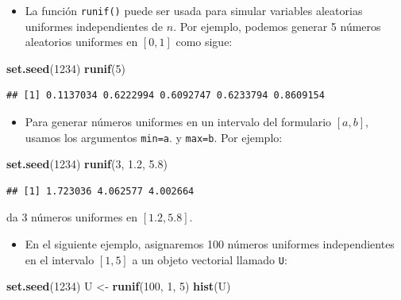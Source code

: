 \documentclass[]{book}
\newenvironment{Shaded}{\begin{snugshade}}{\end{snugshade}}
\newcommand{\KeywordTok}[1]{\textcolor[rgb]{0.13,0.29,0.53}{\textbf{#1}}}
\newcommand{\DecValTok}[1]{\textcolor[rgb]{0.00,0.00,0.81}{#1}}
\newcommand{\FloatTok}[1]{\textcolor[rgb]{0.00,0.00,0.81}{#1}}
\newcommand{\StringTok}[1]{\textcolor[rgb]{0.31,0.60,0.02}{#1}}
\newcommand{\NormalTok}[1]{#1}
\providecommand{\tightlist}{%
  \setlength{\itemsep}{0pt}\setlength{\parskip}{0pt}}
\begin{document}
\begin{itemize}
\tightlist
\item
  La función \texttt{runif()} puede ser usada para simular variables
  aleatorias uniformes independientes de \(n\). Por ejemplo, podemos
  generar 5 números aleatorios uniformes en \([0,1]\) como sigue:
\end{itemize}

\begin{Shaded}
\begin{Highlighting}[]
\KeywordTok{set.seed}\NormalTok{(}\DecValTok{1234}\NormalTok{)}
\KeywordTok{runif}\NormalTok{(}\DecValTok{5}\NormalTok{)}
\end{Highlighting}
\end{Shaded}

\begin{verbatim}
## [1] 0.1137034 0.6222994 0.6092747 0.6233794 0.8609154
\end{verbatim}

\begin{itemize}
\tightlist
\item
  Para generar números uniformes en un intervalo del formulario
  \([a,b]\), usamos los argumentos \texttt{min=a}. y \texttt{max=b}. Por
  ejemplo:
\end{itemize}

\begin{Shaded}
\begin{Highlighting}[]
\KeywordTok{set.seed}\NormalTok{(}\DecValTok{1234}\NormalTok{)}
\KeywordTok{runif}\NormalTok{(}\DecValTok{3}\NormalTok{, }\FloatTok{1.2}\NormalTok{, }\FloatTok{5.8}\NormalTok{)}
\end{Highlighting}
\end{Shaded}

\begin{verbatim}
## [1] 1.723036 4.062577 4.002664
\end{verbatim}

da 3 números uniformes en \([1.2,5.8]\).

\begin{itemize}
\tightlist
\item
  En el siguiente ejemplo, asignaremos 100 números uniformes
  independientes en el intervalo \([1,5]\) a un objeto vectorial llamado
  \texttt{U}:
\end{itemize}

\begin{Shaded}
\begin{Highlighting}[]
\KeywordTok{set.seed}\NormalTok{(}\DecValTok{1234}\NormalTok{)}
\NormalTok{U <-}\StringTok{ }\KeywordTok{runif}\NormalTok{(}\DecValTok{100}\NormalTok{, }\DecValTok{1}\NormalTok{, }\DecValTok{5}\NormalTok{)}
\KeywordTok{hist}\NormalTok{(U)}
\end{Highlighting}
\end{Shaded}
\end{document}
